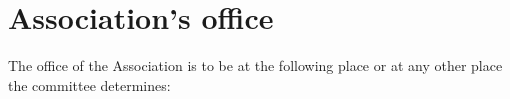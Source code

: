 \section{Association's office}
\label{rule:associationsOffice}

The office of the Association is to be at the following place or at any other place the committee determines:\\
\orgOffice{}